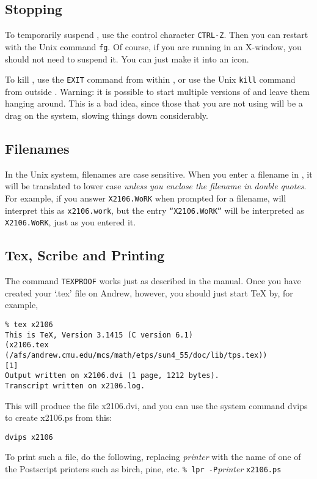 \documentclass{article}
\begin{document}
\subsection{Stopping {\ETPS}}

To temporarily suspend {\ETPS}, use the control character {\tt CTRL-Z}.  Then
you can restart {\ETPS} with the  Unix command {\tt fg}.  Of course, if you
are running {\ETPS} in an X-window, you should not need to suspend it. You
can just make it into an icon.

To kill {\ETPS}, use the {\tt EXIT} command from within {\ETPS}, or use
the Unix {\tt kill} command from outside {\ETPS}.
Warning:  it is possible to start
multiple versions of {\ETPS} and leave them hanging around.
This is a bad idea, since those that
you are not using will be a drag on the system, slowing things down
considerably.



\subsection{Filenames}

In the Unix system, filenames are case sensitive.  When
you enter a filename in {\ETPS}, it will be translated to lower case
{\it unless you enclose the filename in double quotes}.  For example, if
you answer {\tt X2106.WoRK} when prompted for a filename, {\ETPS} will interpret
this as {\tt x2106.work}, but the entry {\tt ``X2106.WoRK''} will be interpreted
as {\tt X2106.WoRK}, just as you entered it.


\pagebreak

\subsection{Tex, Scribe and Printing}

The command {\tt TEXPROOF} works just as described in the {\ETPS} manual.
Once you have created your `.tex' file on Andrew, however, you should just
start TeX by, for example,
\begin{verbatim}
% tex x2106
This is TeX, Version 3.1415 (C version 6.1)
(x2106.tex (/afs/andrew.cmu.edu/mcs/math/etps/sun4_55/doc/lib/tps.tex))
[1]
Output written on x2106.dvi (1 page, 1212 bytes).
Transcript written on x2106.log.
\end{verbatim}
This will produce the file x2106.dvi, and you can use the system command
dvips to create x2106.ps from this:
\begin{verbatim}
dvips x2106
\end{verbatim}
To print such a file, do the following, replacing {\it printer} with
the name of one of the Postscript printers such as birch, pine, etc.\newline
\verb=% lpr -P={\it printer} \verb=x2106.ps=
\end{document}
